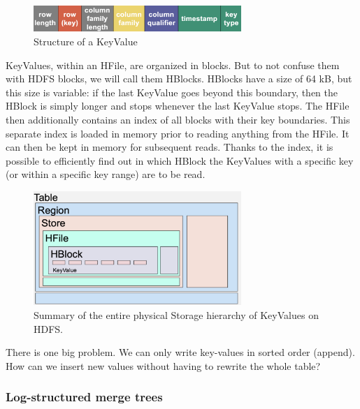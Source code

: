 \begin{figure}[h]
    \centering
    \includegraphics[width=0.7\textwidth]{Figures/KeyValueStructure.jpeg}
    \caption{Structure of a KeyValue}\label{fig:keyValStru}
\end{figure}

KeyValues, within an HFile, are organized in blocks. But to not confuse them with HDFS blocks, we will call them HBlocks. HBlocks have a size of 64 kB, but this size is variable: if the last KeyValue goes beyond this boundary, then the HBlock is simply longer and stops whenever the last KeyValue stops. The HFile then additionally contains an index of all blocks with their key boundaries. This separate index is loaded in memory prior to reading anything from the HFile. It can then be kept in memory for subsequent reads. Thanks to the index, it is possible to efficiently find out in which HBlock the KeyValues with a specific key (or within a specific key range) are to be read.

\begin{figure}[h]
    \centering
    \includegraphics[width=0.7\textwidth]{Figures/SummaryPhysicalStorage.jpeg}
    \caption{Summary of the entire physical Storage hierarchy of KeyValues on HDFS.}\label{fig:SumPhysStor}
\end{figure}

There is one big problem. We can only write key-values in sorted order (append). How can we insert new values without having to rewrite the whole table?

\subsubsection{Log-structured merge trees}

